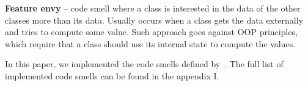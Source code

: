 \begin{flushleft}
    \textbf{Feature envy} -- code smell where a class is interested in the data of the other classes more than its data.
    Usually occurs when a class gets the data externally and tries to compute some value.
    Such approach goes against OOP principles, which require that a class should use its internal state to compute the values.
\end{flushleft}

In this paper, we implemented the code smells defined by~\citeauthor{refactoring-fowler}.
The full list of implemented code smells can be found in the appendix I\@.
